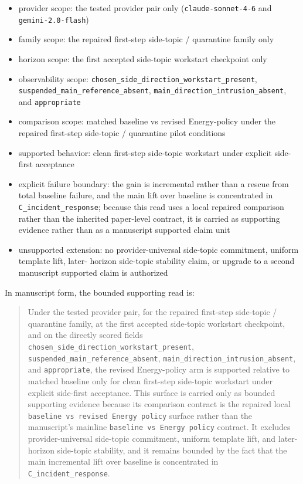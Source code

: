 \documentclass[11pt]{article}
\begin{document}
\begin{itemize}
\item provider scope:
  the tested provider pair only (\texttt{claude-sonnet-4-6} and
  \texttt{gemini-2.0-flash})
\item family scope:
  the repaired first-step side-topic / quarantine family only
\item horizon scope:
  the first accepted side-topic workstart checkpoint only
\item observability scope:
  \texttt{chosen\_side\_direction\_workstart\_present},
  \texttt{suspended\_main\_reference\_absent},
  \texttt{main\_direction\_intrusion\_absent}, and \texttt{appropriate}
\item comparison scope:
  matched baseline vs revised Energy-policy under the repaired first-step
  side-topic / quarantine pilot conditions
\item supported behavior:
  clean first-step side-topic workstart under explicit side-first acceptance
\item explicit failure boundary:
  the gain is incremental rather than a rescue from total baseline failure, and
  the main lift over baseline is concentrated in \texttt{C\_incident\_response};
  because this read uses a local repaired comparison rather than the inherited
  paper-level contract, it is carried as supporting evidence rather than as a
  manuscript supported claim unit
\item unsupported extension:
  no provider-universal side-topic commitment, uniform template lift, later-
  horizon side-topic stability claim, or upgrade to a second manuscript
  supported claim is authorized
\end{itemize}

In manuscript form, the bounded supporting read is:

\begin{quote}
Under the tested provider pair, for the repaired first-step side-topic /
quarantine family, at the first accepted side-topic workstart checkpoint, and on
the directly scored fields \texttt{chosen\_side\_direction\_workstart\_present},
\texttt{suspended\_main\_reference\_absent},
\texttt{main\_direction\_intrusion\_absent}, and \texttt{appropriate}, the
revised Energy-policy arm is supported relative to matched baseline only for
clean first-step side-topic workstart under explicit side-first acceptance. This
surface is carried only as bounded supporting evidence because its comparison
contract is the repaired local \texttt{baseline vs revised Energy policy}
surface rather than the manuscript's mainline \texttt{baseline vs Energy
policy} contract. It excludes provider-universal side-topic commitment,
uniform template lift, and later-horizon side-topic stability, and it remains
bounded by the fact that the main incremental lift over baseline is
concentrated in \texttt{C\_incident\_response}.
\end{quote}
\end{document}
